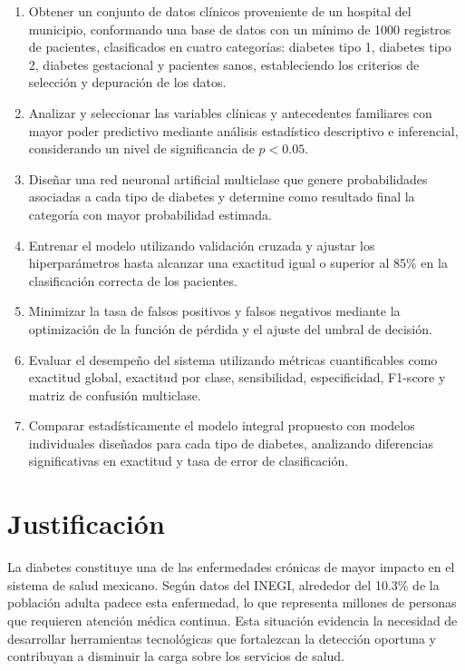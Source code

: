 \begin{enumerate}
	
	\item Obtener un conjunto de datos cl\'inicos proveniente de un hospital del municipio, conformando una base de datos con un m\'inimo de 1000 registros de pacientes, clasificados en cuatro categor\'ias: diabetes tipo 1, diabetes tipo 2, diabetes gestacional y pacientes sanos, estableciendo los criterios de selecci\'on y depuraci\'on de los datos.
	
	\item Analizar y seleccionar las variables cl\'inicas y antecedentes familiares con mayor poder predictivo mediante an\'alisis estad\'istico descriptivo e inferencial, considerando un nivel de significancia de $p < 0.05$.
	
	\item Dise\~nar una red neuronal artificial multiclase que genere probabilidades asociadas a cada tipo de diabetes y determine como resultado final la categor\'ia con mayor probabilidad estimada.
	
	\item Entrenar el modelo utilizando validaci\'on cruzada y ajustar los hiperpar\'ametros hasta alcanzar una exactitud igual o superior al 85\% en la clasificaci\'on correcta de los pacientes.
	
	\item Minimizar la tasa de falsos positivos y falsos negativos mediante la optimizaci\'on de la funci\'on de p\'erdida y el ajuste del umbral de decisi\'on.
	
	\item Evaluar el desempe\~no del sistema utilizando m\'etricas cuantificables como exactitud global, exactitud por clase, sensibilidad, especificidad, F1-score y matriz de confusi\'on multiclase.
	
	\item Comparar estad\'isticamente el modelo integral propuesto con modelos individuales dise\~nados para cada tipo de diabetes, analizando diferencias significativas en exactitud y tasa de error de clasificaci\'on.
	
\end{enumerate}

\section{Justificaci\'on}

La diabetes constituye una de las enfermedades cr\'onicas de mayor impacto en el sistema de salud mexicano. Seg\'un datos del INEGI, alrededor del 10.3\% de la poblaci\'on adulta padece esta enfermedad, lo que representa millones de personas que requieren atenci\'on m\'edica continua. Esta situaci\'on evidencia la necesidad de desarrollar herramientas tecnol\'ogicas que fortalezcan la detecci\'on oportuna y contribuyan a disminuir la carga sobre los servicios de salud.

